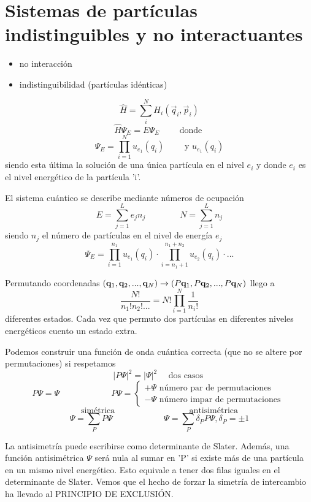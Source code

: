 \documentclass[10pt,oneside]{CBFT_book}
\begin{document}
\section{Sistemas de partículas indistinguibles y no interactuantes}

\begin{itemize}
 \item no interacción
 \item indistinguibilidad (partículas idénticas)
\end{itemize}

\[
	\hat{H} = \sum_i^N H_i (\vec{q}_i , \vec{p}_i )
\]
\[
	\hat{H} \Psi_E = E \Psi_E \qquad \text{ donde }
\]
\[
	\Psi_E = \prod_{i=1}^{N} u_{e_1}(q_i) \qquad \text{ y } u_{e_1}(q_i)
\]
siendo esta última la solución de una única partícula en el nivel $e_i$ 
y donde $e_i$ es el nivel energético de la partícula 'i'.

El sistema cuántico se describe mediante números de ocupación
\[
	E = \sum_{j=1}^L e_j n_j  \qquad \qquad  N = \sum_{j=1}^L  n_j
\]
siendo $n_j$ el número de partículas en el nivel de energía $e_j$ 
\[
	\Psi_E = \prod_{i=1}^{n_1} u_{e_1}(q_i) \cdot \prod_{i = n_1 + 1 }^{ n_1 + n_2 } u_{e_2}(q_i) \cdot ...
\]

Permutando coordenadas $(\vb{q}_1,\vb{q}_2,...,\vb{q}_N ) \to (P\vb{q}_1,P\vb{q}_2,...,P\vb{q}_N)$ llego a
\[
	\frac{N!}{n_1!n_2!...} = N! \prod_{i=1}^N \frac{1}{n_i!}
\]
diferentes estados. Cada vez que permuto dos partículas en diferentes niveles energéticos cuento un estado extra.

Podemos construir una función de onda cuántica correcta (que no se altere por permutaciones) si respetamos
\[
	| P\Psi |^2 = | \Psi |^2 \quad \text{ dos casos }
\]
\[
	P\Psi = \Psi \qquad \qquad \qquad P\Psi = 
	\begin{cases}
	+ \Psi \text{ número par de permutaciones } \\ 
	- \Psi \text{ número impar de permutaciones } 
	\end{cases}
\]
\[
	\text{ simétrica } \qquad \qquad \qquad \qquad \text{ antisimétrica } 
\]
\[
	\Psi = \sum_P P\Psi \qquad \qquad \qquad \Psi = \sum_P \delta_P P\Psi, \delta_P = \pm 1
\]

La antisimetría puede escribirse como determinante de Slater. Además, una función antisimétrica $\Psi$ será nula 
al sumar en 'P' si existe más de una partícula en un mismo nivel energético. Esto equivale a tener dos filas
iguales en el determinante de Slater.
Vemos que el hecho de forzar la simetría de intercambio ha llevado al PRINCIPIO DE EXCLUSIÓN.
\end{document}
